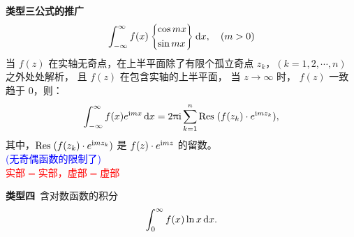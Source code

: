 \documentclass[12pt, a4paper, oneside, UTF8]{ctexbook}
\begin{document}
\noindent \textbf{类型三公式的推广}
\begin{align*}
    \int_{-\infty}^{\infty} f(x) 
    \left\{ 
    \begin{lgathered} 
        \cos mx\\
        \sin mx
    \end{lgathered}   
    \right\}
    \dif x,\quad (m>0)
\end{align*}
当 $f(z)$ 在实轴无奇点，在上半平面除了有限个孤立奇点 $z_k$，$(k=1,2,\cdots,n)$ 之外处处解析，
且 $f(z)$ 在包含实轴的上半平面，
当 $z\to\infty$ 时， $f(z)$ 一致趋于 $0$，则：
\[\int_{-\infty}^{\infty} f(x) e^{\mathrm{i} m x} \mathop{}\!\mathrm{d} x 
= 2 \uppi \mathrm{i} \sum_{k=1}^n \mathrm{Res}\;(f(z_k)\cdot e^{\mathrm{i} m z_k}),\]
其中，$\mathrm{Res}\;(f(z_k)\cdot e^{\mathrm{i} m z_k})$ 是 $f(z)\cdot e^{\mathrm{i} m z}$ 的留数。\\
\textcolor{blue}{(无奇偶函数的限制了)}\\
\textcolor{red}{实部$=$实部，虚部$=$虚部}

\noindent \textbf{类型四}\ 含对数函数的积分
\[\int_{0}^{\infty} f(x) \ln x \mathop{}\!\mathrm{d} x.\]

\ifx\allfiles\undefined
\end{document}
